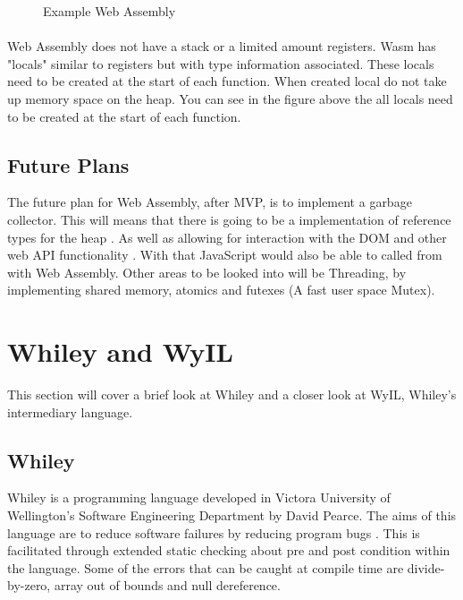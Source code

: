 \begin{figure}[H]
  \centering
  
  \caption{Example Web Assembly}
  \label{fig:wasm}
\end{figure}

\paragraph{}

Web Assembly does not have a stack or a limited amount registers. Wasm has "locals" similar to registers but with type information associated. These locals need to be created at the start of each function. When created local do not take up memory space on the heap. You can see in the figure above the all locals need to be created at the start of each function.

\subsection{Future Plans}\label{subsec:wafp}

The future plan for Web Assembly, after MVP, is to implement a garbage collector. This will means that there is going to be a implementation of reference types for the heap \cite{5_gohman_wagner_bastien_2016}. As well as allowing for interaction with the DOM and other web API functionality \cite{5_gohman_wagner_bastien_2016}. With that JavaScript would also be able to called from with Web Assembly. Other areas to be looked into will be Threading, by implementing shared memory, atomics and futexes (A fast user space Mutex)\cite{12_bastien_wagner_gohman_2016}.

\section{Whiley and WyIL}

This section will cover a brief look at Whiley and a closer look at WyIL, Whiley's intermediary language.

\subsection{Whiley}\label{subsec:wy}
Whiley is a programming language developed in Victora University of Wellington's Software Engineering Department by David Pearce. The aims of this language are to reduce software failures by reducing program bugs \cite{2_pearce_2016}. This is facilitated through extended static checking \cite{2_pearce_2016} about pre and post condition within the language. Some of the errors that can be caught at compile time are divide-by-zero, array out of bounds and null dereference\cite{2_pearce_2016}.

